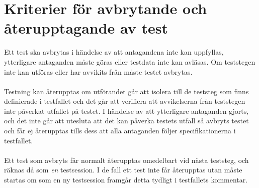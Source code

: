\section{Kriterier för avbrytande och återupptagande av test}
Ett test ska avbrytas i händelse av att antagandena inte kan uppfyllas, ytterligare antaganden måste göras eller testdata inte kan avläsas. Om teststegen inte kan utföras eller har avvikits från måste testet avbrytas. 
\\
\\
Testning kan återupptas om utförandet går att isolera till de teststeg som finns definierade i testfallet och det går att verifiera att avvikelserna från teststegen inte påverkat utfallet på testet. I händelse av att ytterligare antaganden gjorts, och det inte går att utesluta att det kan påverka testets utfall så avbryts testet och får ej återupptas tills dess att alla antaganden följer specifikationerna i testfallet. 
\\
\\
Ett test som avbryts får normalt återupptas omedelbart vid nästa teststeg, och räknas då som \emph{en} testsession. I de fall ett test inte får återupptas utan måste startas om som en ny testsession framgår detta tydligt i testfallets kommentar.